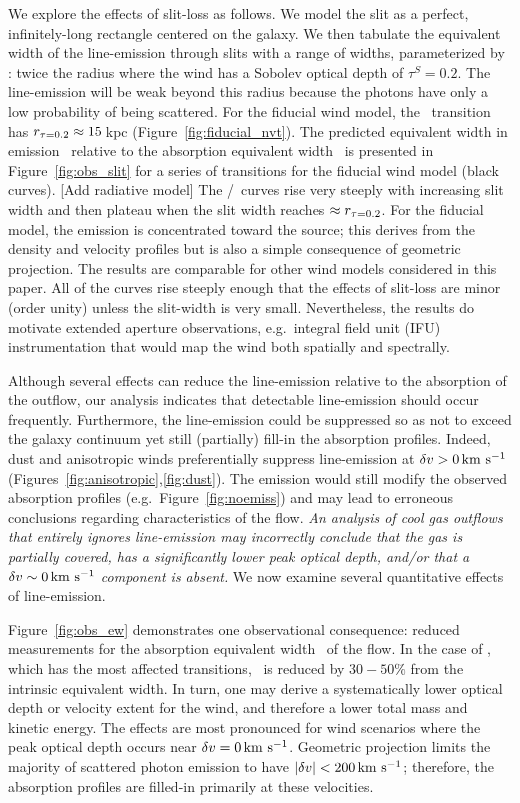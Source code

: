 \documentclass[12pt,preprint]{aastex}
\begin{document}
We explore the effects of slit-loss as follows.
We model the slit as a perfect, infinitely-long rectangle centered on the
galaxy.  We then tabulate the equivalent width of the line-emission
through slits with a range of widths, parameterized by \rtt: twice the radius
where the wind has a Sobolev optical depth of $\tau^S = 0.2$. 
The line-emission will be weak beyond
this radius because the photons have only a low probability of
being scattered.  For the fiducial wind model, 
the \mgiia\ transition has $r_{\tau = 0.2} \approx 15$\,kpc 
(Figure~\ref{fig:fiducial_nvt}).  
The predicted equivalent width in emission \ewe\ relative to the absorption
equivalent width \ewabs\ is presented in
Figure~\ref{fig:obs_slit} for a series of transitions for the fiducial
wind model (black curves).
[Add radiative model]
The \ewe/\ewabs\ curves rise very steeply with increasing slit width and then
plateau when the slit width reaches $\approx r_{\tau = 0.2}$.  
For the fiducial model, the emission is concentrated toward the source; this
derives from the density and velocity profiles but is also a simple
consequence of geometric projection.
The results are comparable for other wind models considered
in this paper. 
All of the curves rise steeply enough that 
the effects of slit-loss are minor (order unity)
unless the slit-width is very small.   
Nevertheless, the results do motivate
extended aperture observations, e.g.\ integral field unit (IFU)
instrumentation that would map the wind both spatially and spectrally.


Although several effects can reduce the line-emission
relative to the absorption of the outflow, our analysis
indicates that detectable line-emission should occur frequently. 
Furthermore, the line-emission could be suppressed so as not to exceed
the galaxy continuum yet still (partially) fill-in the absorption
profiles. Indeed, dust and anisotropic winds preferentially suppress
line-emission at $\delta v > 0 \, {\rm km~s^{-1}}$
(Figures~\ref{fig:anisotropic},\ref{fig:dust}).
The emission would still 
modify the observed absorption profiles (e.g.\
Figure~\ref{fig:noemiss}) and may lead to erroneous conclusions
regarding characteristics of the flow.  {\it An analysis of cool gas outflows
that entirely ignores line-emission may incorrectly conclude that the gas is
partially covered, has a significantly lower peak optical depth,
and/or that a $\delta v \sim 0 \, {\rm km~s^{-1}}$ component is
absent.}  
We now examine several quantitative effects of line-emission.

Figure~\ref{fig:obs_ew} demonstrates one observational
consequence: reduced measurements for the absorption
equivalent width \ewabs\ of the flow.  In the case of ,
which has the most affected transitions, \ewabs\ is reduced by
$30-50\%$ from the intrinsic equivalent width.  In turn, one may derive 
a systematically lower optical depth or velocity extent for the wind,
and therefore a lower total mass and kinetic energy.  
The effects are most pronounced for wind
scenarios where the peak optical depth occurs near $\delta v = 0 \, {\rm km~s^{-1}}$.
Geometric projection limits the majority of scattered photon emission to
have $|\delta v| < 200 \, {\rm km~s^{-1}}$; therefore,  the absorption profiles
are filled-in primarily at these velocities.  
\end{document}
